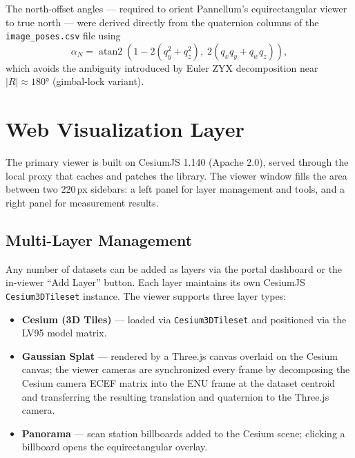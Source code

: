 The north-offset angles — required to orient Pannellum's equirectangular
viewer to true north — were derived directly from the quaternion columns of
the \texttt{image\_poses.csv} file using
\begin{equation}
  \alpha_N = \operatorname{atan2}\!\left(1 - 2(q_y^2 + q_z^2),\;
    2(q_x q_y + q_w q_z)\right),
\end{equation}
which avoids the ambiguity introduced by Euler ZYX decomposition near
$|R| \approx 180°$ (gimbal-lock variant).

\section{Web Visualization Layer}
\label{sec:viewer}

The primary viewer is built on CesiumJS 1.140 (Apache 2.0), served through the
local proxy that caches and patches the library. The viewer window fills the
area between two 220\,px sidebars: a left panel for layer management and tools,
and a right panel for measurement results.

\subsection{Multi-Layer Management}

Any number of datasets can be added as layers via the portal dashboard or the
in-viewer ``Add Layer'' button. Each layer maintains its own CesiumJS
\texttt{Cesium3DTileset} instance. The viewer supports three layer types:

\begin{itemize}
  \item \textbf{Cesium (3D Tiles)} — loaded via \texttt{Cesium3DTileset} and
    positioned via the LV95 model matrix.
  \item \textbf{Gaussian Splat} — rendered by a Three.js canvas overlaid on
    the Cesium canvas; the viewer cameras are synchronized every frame by
    decomposing the Cesium camera ECEF matrix into the ENU frame at the
    dataset centroid and transferring the resulting translation and quaternion
    to the Three.js camera.
  \item \textbf{Panorama} — scan station billboards added to the Cesium scene;
    clicking a billboard opens the equirectangular overlay.
\end{itemize}

